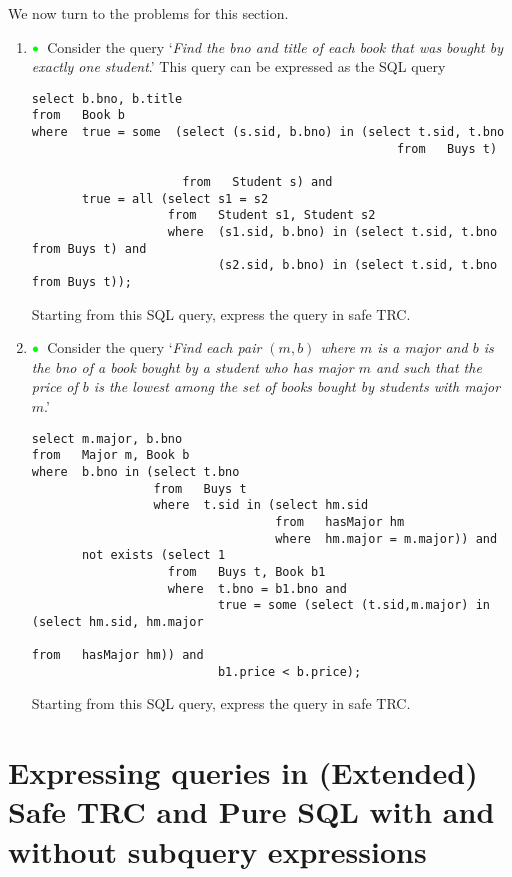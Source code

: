 \documentclass[11pt]{article}
\newcommand{\green}[1]{{\color{green}#1}}
\newcommand{\greenbullet}{$\green{\bullet}$}
\begin{document}
We now turn to the problems for this section.

\begin{enumerate}
\item\label{queryOne} \greenbullet\  Consider the query `\emph{Find the bno and title of each book that was bought by exactly one student}.'   This query can be expressed as the SQL query

{\footnotesize
\begin{verbatim}
select b.bno, b.title
from   Book b
where  true = some  (select (s.sid, b.bno) in (select t.sid, t.bno
	                                               from   Buys t)

                     from   Student s) and
       true = all (select s1 = s2
                   from   Student s1, Student s2
                   where  (s1.sid, b.bno) in (select t.sid, t.bno from Buys t) and
                          (s2.sid, b.bno) in (select t.sid, t.bno from Buys t));
\end{verbatim}
}

Starting from this SQL query, express the query in safe TRC.


\item\label{queryTwo} \greenbullet\   
Consider the query `\emph{Find each pair $(m, b)$
where $m$ is a major and $b$ is the bno of a book bought by a student who has major $m$ and such that the price of $b$ is the lowest among the set of books bought by students with major $m$}.' 



{\footnotesize
\begin{verbatim}
select m.major, b.bno
from   Major m, Book b
where  b.bno in (select t.bno
                 from   Buys t
                 where  t.sid in (select hm.sid
                                  from   hasMajor hm
                                  where  hm.major = m.major)) and
       not exists (select 1
                   from   Buys t, Book b1
                   where  t.bno = b1.bno and
                          true = some (select (t.sid,m.major) in (select hm.sid, hm.major 
                                                                  from   hasMajor hm)) and
                          b1.price < b.price);
\end{verbatim}
}

Starting from this SQL query, express the query in safe TRC.


\end{enumerate}


\section{Expressing queries in (Extended) Safe TRC and
Pure SQL with and without subquery expressions}
\label{PureSQL}
\end{document}
